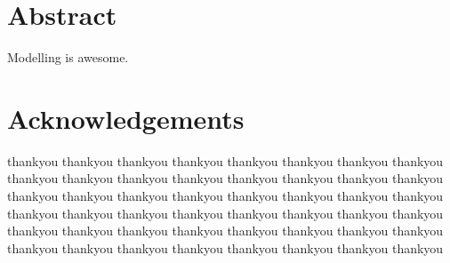 \newpage
\section*{Abstract}
Modelling is awesome.

\section*{Acknowledgements}
thankyou thankyou thankyou thankyou thankyou thankyou thankyou thankyou thankyou thankyou thankyou thankyou thankyou thankyou thankyou thankyou thankyou thankyou thankyou thankyou thankyou thankyou thankyou thankyou thankyou thankyou thankyou thankyou thankyou thankyou thankyou thankyou thankyou thankyou thankyou thankyou thankyou thankyou thankyou thankyou thankyou thankyou thankyou thankyou thankyou thankyou thankyou thankyou 

